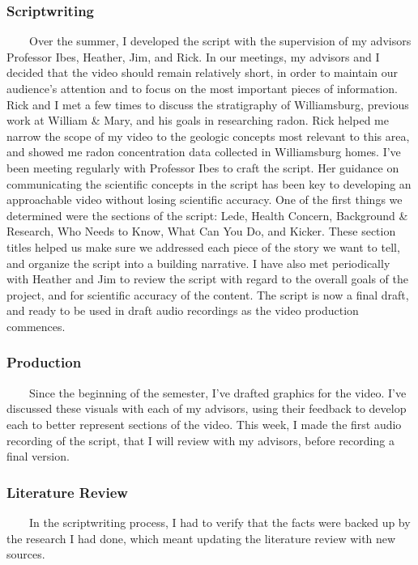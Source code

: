 \documentclass[
]{article}
\begin{document}
\subsubsection{Scriptwriting}

~~~~Over the summer, I developed the script with the supervision of my
advisors Professor Ibes, Heather, Jim, and Rick. In our meetings, my
advisors and I decided that the video should remain relatively short, in
order to maintain our audience's attention and to focus on the most
important pieces of information. Rick and I met a few times to discuss
the stratigraphy of Williamsburg, previous work at William \& Mary, and
his goals in researching radon. Rick helped me narrow the scope of my
video to the geologic concepts most relevant to this area, and showed me
radon concentration data collected in Williamsburg homes. I've been
meeting regularly with Professor Ibes to craft the script. Her guidance
on communicating the scientific concepts in the script has been key to
developing an approachable video without losing scientific accuracy. One
of the first things we determined were the sections of the script: Lede,
Health Concern, Background \& Research, Who Needs to Know, What Can You
Do, and Kicker. These section titles helped us make sure we addressed
each piece of the story we want to tell, and organize the script into a
building narrative. I have also met periodically with Heather and Jim to
review the script with regard to the overall goals of the project, and
for scientific accuracy of the content. The script is now a final draft,
and ready to be used in draft audio recordings as the video production
commences.

\subsubsection{Production}

~~~~Since the beginning of the semester, I've drafted graphics for the
video. I've discussed these visuals with each of my advisors, using
their feedback to develop each to better represent sections of the
video. This week, I made the first audio recording of the script, that I
will review with my advisors, before recording a final version.

\subsubsection{Literature Review}

~~~~In the scriptwriting process, I had to verify that the facts were backed
up by the research I had done, which meant updating the literature
review with new sources.
\end{document}
